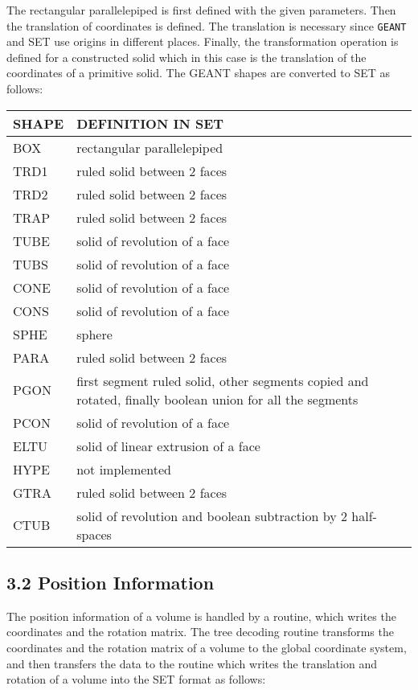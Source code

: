 The rectangular parallelepiped is first defined with the given parameters.
Then the translation of coordinates is defined. The translation is necessary
since {\tt GEANT} and SET use origins in different places. Finally,
the transformation operation is defined for a constructed solid which
in this case is the translation of the coordinates of a primitive solid.
The GEANT shapes are converted to SET as follows:
 
\begin{center}
 \begin{tabular}{|l|p{9.0 cm}|}
 \hline
 \bf SHAPE           &  \bf DEFINITION IN SET \\
 \hline
BOX  &   rectangular parallelepiped \\
TRD1 &   ruled solid between 2 faces   \\
TRD2 &   ruled solid between 2 faces \\
TRAP &   ruled solid between 2 faces \\
TUBE &   solid of revolution of a face \\
TUBS &   solid of revolution of a face \\
CONE &   solid of revolution of a face \\
CONS &   solid of revolution of a face \\
SPHE &   sphere \\
PARA &   ruled solid between 2 faces \\
PGON &   first segment ruled solid, other segments copied and rotated,
         finally boolean union for all the segments \\
PCON &   solid of revolution of a face \\
ELTU &   solid of linear extrusion of a face \\
HYPE &   not implemented \\
GTRA &   ruled solid between 2 faces \\
CTUB &   solid of revolution and boolean subtraction by 2 half-spaces \\
 \hline
 \end{tabular}
\end{center}
 
 
\subsection*{3.2 Position Information}
 
The position information of
a volume is handled by a routine,
which writes the coordinates and the rotation matrix. The tree decoding
routine transforms the coordinates and the rotation matrix of a volume 
to the global coordinate system, and then transfers the data
to the routine which writes the translation and rotation of a volume into
the SET format as follows:
 
